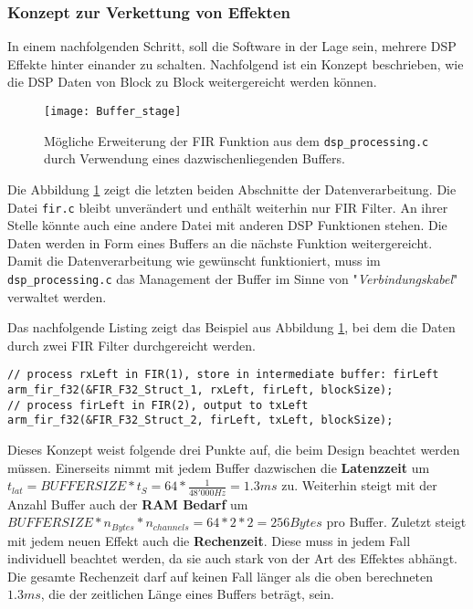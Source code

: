 \subsubsection{Konzept zur Verkettung von Effekten}
\label{sec:DSPChaining}

In einem nachfolgenden Schritt, soll die Software in der Lage sein, mehrere DSP Effekte hinter einander zu schalten. Nachfolgend ist ein Konzept beschrieben, wie die DSP Daten von Block zu Block weitergereicht werden können.

\begin{figure}[H]
	\centering
	\texttt{[image: Buffer\_stage]}
	\caption{Mögliche Erweiterung der FIR Funktion aus dem \texttt{dsp\_processing.c} durch Verwendung eines dazwischenliegenden Buffers.}
	\label{pic:Buffer_stage}
\end{figure}

Die Abbildung \ref{pic:Buffer_stage} zeigt die letzten beiden Abschnitte der Datenverarbeitung. Die Datei \texttt{fir.c} bleibt unverändert und enthält weiterhin nur FIR Filter. An ihrer Stelle könnte auch eine andere Datei mit anderen DSP Funktionen stehen.
Die Daten werden in Form eines Buffers an die nächste Funktion weitergereicht.
Damit die Datenverarbeitung wie gewünscht funktioniert, muss im \texttt{dsp\_processing.c} das Management der Buffer im Sinne von "\textit{Verbindungskabel}" verwaltet werden.

Das nachfolgende Listing zeigt das Beispiel aus Abbildung \ref{pic:Buffer_stage}, bei dem die Daten durch zwei FIR Filter durchgereicht werden.

\begin{lstlisting}[style=Cuvision, caption={Daten mittels Buffer und zwei FIR Filter bearbeiten}]
// process rxLeft in FIR(1), store in intermediate buffer: firLeft
arm_fir_f32(&FIR_F32_Struct_1, rxLeft, firLeft, blockSize);
// process firLeft in FIR(2), output to txLeft
arm_fir_f32(&FIR_F32_Struct_2, firLeft, txLeft, blockSize);

\end{lstlisting}

Dieses Konzept weist folgende drei Punkte auf, die beim Design beachtet werden müssen.
Einerseits nimmt mit jedem Buffer dazwischen die \textbf{Latenzzeit} um $t_{lat}=BUFFERSIZE*t_S=64*\frac{1}{48'000\si{Hz}}=1.3\si{ms}$ zu.
Weiterhin steigt mit der Anzahl Buffer auch der \textbf{RAM Bedarf} um $BUFFERSIZE*n_{Bytes}*n_{channels}=64*2*2=256\si{Bytes}$ pro Buffer.
Zuletzt steigt mit jedem neuen Effekt auch die \textbf{Rechenzeit}. Diese muss in jedem Fall individuell beachtet werden, da sie auch stark von der Art des Effektes abhängt.
Die gesamte Rechenzeit darf auf keinen Fall länger als die oben berechneten $1.3\si{ms}$, die der zeitlichen Länge eines Buffers beträgt, sein.



